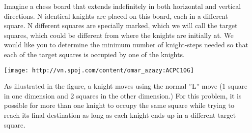 Imagine a chess board that extends indefinitely in both horizontal and vertical directions. N identical knights are placed on this board, each in a different square. N different squares are specially marked, which we will call the target squares, which could be different from where the knights are initially at. We would like you to determine the minimum number of knight-steps needed so that each of the target squares is occupied by one of the knights.


\texttt{[image: http://vn.spoj.com/content/omar\_azazy:ACPC10G]}

As illustrated in the figure, a knight moves using the normal ”L” move (1 square in one dimension and 2 squares in the other dimension.) For this problem, it is possible for more than one knight to occupy the same square while trying to reach its final destination as long as each knight ends up in a different target square.